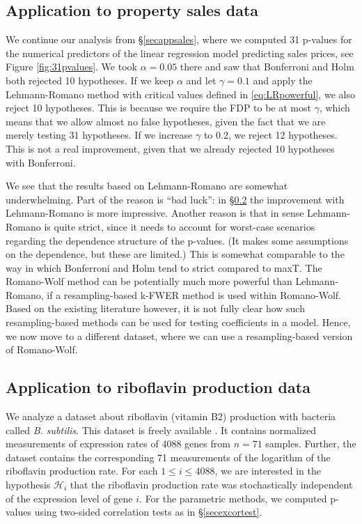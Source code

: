 \documentclass[11pt]{article}
\theoremstyle{plain}
\theoremstyle{definition}
\newcommand{\Hy}{\mathcal{H}}
\newcommand{\citp}{\citep}
\begin{document}
 \subsection{Application  to  property sales data}
 We continue our analysis from \S\ref{secappsales}, where we computed 31 p-values for the numerical predictors of the linear regression model predicting sales prices, see Figure \ref{fig:31pvalues}.  We took $\alpha=0.05$ there and saw that Bonferroni and Holm both rejected 10 hypotheses. If we keep $\alpha$ and let $\gamma=0.1$ and apply the Lehmann-Romano method with critical values defined in \eqref{eq:LRpowerful}, we also reject 10 hypotheses. This is because we require the FDP to be at most $\gamma$, which means that we allow almost no false hypotheses, given the fact that we are merely testing 31 hypotheses. If we increase $\gamma$ to 0.2, we reject 12 hypotheses. This is not a real improvement, given that  we already rejected 10 hypotheses with Bonferroni. 
 
 We see that the results based on Lehmann-Romano are somewhat underwhelming. Part of the reason is ``bad luck'': in \S\ref{secribo} the improvement with Lehmann-Romano is more impressive.
Another reason is that in sense Lehmann-Romano is quite strict, since it needs to account for  worst-case scenarios regarding the dependence structure of the p-values. (It makes some  assumptions on the dependence, but these are limited.) 
This is somewhat comparable to the way in which Bonferroni and Holm tend to strict compared to maxT.
The Romano-Wolf method can be potentially much more powerful than Lehmann-Romano, if a resampling-based k-FWER method is used within Romano-Wolf. Based on the existing literature however, it is not fully clear how such resampling-based methods can be used for testing coefficients in a model.
 Hence, we now move to a different dataset, where we can use a resampling-based version of Romano-Wolf.
 
 
 
 
  \subsection{Application  to  riboflavin production data} \label{secribo}
We analyze a dataset about riboflavin (vitamin B2) production with  bacteria called \emph{B. subtilis}. This dataset
is freely available \citp{buhlmann2014high}. It contains normalized measurements
of expression rates of 4088 genes from $n = 71$ samples. 
Further, the dataset contains the corresponding 71 measurements of the logarithm of the riboflavin production
rate.
For each $1 \leq i \leq  4088$, we are interested in the hypothesis  $\Hy_i$ that the riboflavin production
rate was stochastically independent
of the expression level of gene $i$. 
For the parametric methods, we computed p-values using two-sided correlation tests as in \S\ref{secexcortest}. 
\end{document}
